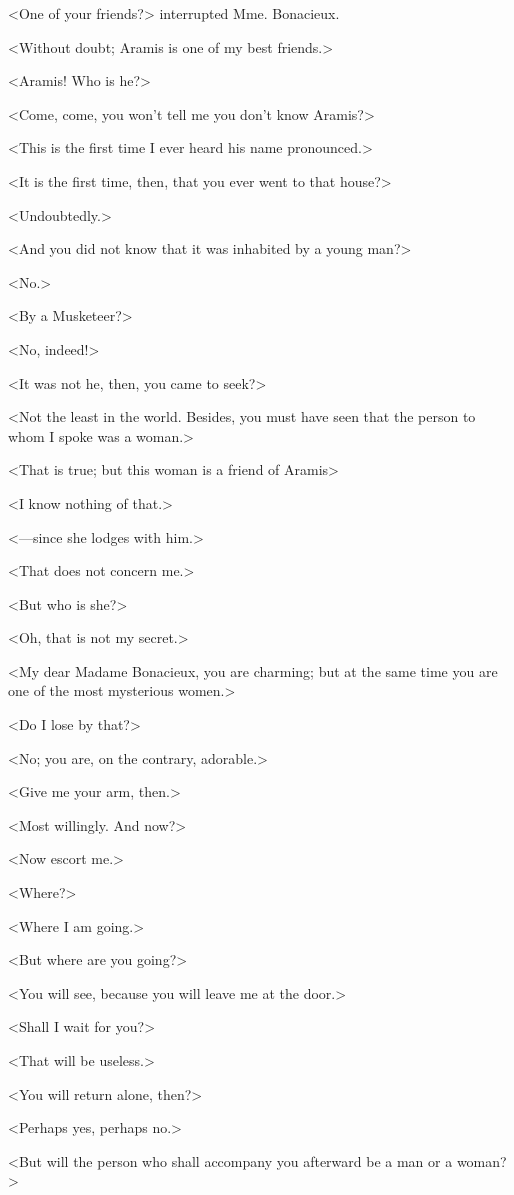 <One of your friends?> interrupted Mme. Bonacieux. 

<Without doubt; Aramis is one of my best friends.> 

<Aramis! Who is he?> 

<Come, come, you won't tell me you don't know Aramis?> 

<This is the first time I ever heard his name pronounced.> 

<It is the first time, then, that you ever went to that house?> 

<Undoubtedly.> 

<And you did not know that it was inhabited by a young man?> 

<No.> 

<By a Musketeer?> 

<No, indeed!> 

<It was not he, then, you came to seek?> 

<Not the least in the world. Besides, you must have seen that the person to whom I spoke was a woman.> 

<That is true; but this woman is a friend of Aramis\longdash> 

<I know nothing of that.> 

<---since she lodges with him.> 

<That does not concern me.> 

<But who is she?> 

<Oh, that is not my secret.> 

<My dear Madame Bonacieux, you are charming; but at the same time you are one of the most mysterious women.> 

<Do I lose by that?> 

<No; you are, on the contrary, adorable.> 

<Give me your arm, then.> 

<Most willingly. And now?> 

<Now escort me.> 

<Where?> 

<Where I am going.> 

<But where are you going?> 

<You will see, because you will leave me at the door.> 

<Shall I wait for you?> 

<That will be useless.> 

<You will return alone, then?> 

<Perhaps yes, perhaps no.> 

<But will the person who shall accompany you afterward be a man or a woman?> 

